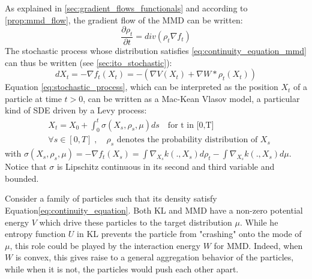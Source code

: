 As explained in \cref{sec:gradient_flows_functionals} and according to \cref{prop:mmd_flow}, the gradient flow of the MMD can be written:
\begin{equation}\label{eq:continuity_equation_mmd}
\frac{\partial \rho_t}{\partial t}= div(\rho_t  \nabla f_t)
\end{equation}
The stochastic process whose distribution satisfies \eqref{eq:continuity_equation_mmd} can thus be written (see \cref{sec:ito_stochastic}):
\begin{equation}\label{eq:stochastic_process}
dX_t=-\nabla f_t(X_t) = - (\nabla V (X_t) + \nabla W * \rho_t(X_t))
\end{equation}
 Equation \eqref{eq:stochastic_process}, which can be interpreted as the position $X_t$ of a particle at time $t > 0$, can be written as a Mac-Kean Vlasov model, a particular kind of SDE driven by a Levy process:
\begin{align}\label{eq:theoretical_process}
&X_t=X_{0}+\int_{0}^t \sigma(X_s, \rho_s, \mu)ds \quad \text{for t in [0,T]}\\
&\forall s \in [0,T]\;,\quad \rho_s \text{ denotes the probability distribution of } X_s
\end{align}
with $\sigma(X_s, \rho_s, \mu)=-\nabla f_t(X_s)=\int \nabla_{X_s}k(.,X_s) d\rho_t -  \int \nabla_{X_s}k(.,X_s) d\mu$. Notice that $\sigma$ is Lipschitz continuous in its second and third variable and bounded.

\begin{remark}
	Consider a family of particles such that its density satisfy Equation\eqref{eq:continuity_equation}. Both KL and MMD have a non-zero potential energy $V$ which drive these particles to the target distribution $\mu$. While he entropy function $U$ in KL prevents the particle from "crashing" onto the mode of $\mu$, this role could be played by the interaction energy $W$ for MMD. Indeed, when $W$ is convex, this gives raise to a general
	aggregation behavior of the particles, while when it is not, the particles would push each other apart.
\end{remark}

